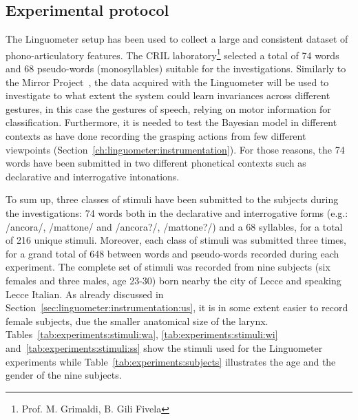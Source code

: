 \subsection{Experimental protocol}
\label{sec:experiments:protocol}
The Linguometer setup has been used to collect a large and consistent dataset
of phono-articulatory features.
The CRIL laboratory\footnote{Prof. M. Grimaldi, B. Gili Fivela} selected a
total of 74 words and 68 pseudo-words (monosyllables) suitable for the 
investigations.
Similarly to the Mirror Project~\citep{metta.etal:2006}, the data acquired
with the Linguometer will be
used to investigate to what extent the system could learn invariances across 
different gestures, in this case the gestures of speech, relying on motor 
information for classification.
Furthermore, it is needed to test the Bayesian model in different contexts as 
\citet{metta.etal:2006} have done recording the grasping actions from few
different viewpoints (Section~\ref{ch:linguometer:instrumentation}).
For those reasons, the 74 words have been submitted in two different
phonetical contexts such as declarative and interrogative intonations.



To sum up, three classes of stimuli have been submitted to the subjects 
during the investigations: 74 words both in the declarative and interrogative 
forms (e.g.: /ancora/, /mattone/ and /ancora?/, /mattone?/) and a 68 syllables, 
for a total of 216 unique stimuli.
Moreover, each class of stimuli was submitted three times, for a grand total 
of 648 between words and pseudo-words recorded during each experiment.
The complete set of stimuli was recorded from nine subjects (six females and
three males, age 23-30) born nearby the city of Lecce and speaking Lecce
Italian.
As already discussed in Section~\ref{sec:linguometer:instrumentation:us}, it is in
some extent easier to record female subjects, due the smaller anatomical size of
the larynx.
Tables~\ref{tab:experiments:stimuli:wa}, \ref{tab:experiments:stimuli:wi} 
and~\ref{tab:experiments:stimuli:ss} show the stimuli used for the
Linguometer experiments while Table~\ref{tab:experiments:subjects} illustrates 
the age and the gender of the nine subjects.


